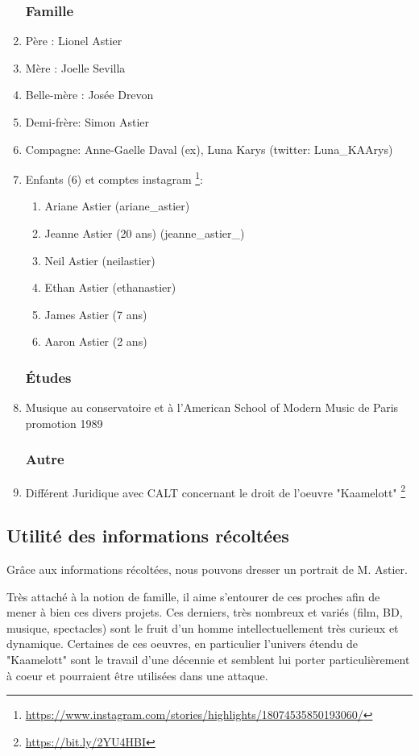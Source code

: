 \begin{enumerate}
\subsubsection{Famille}
\item Père : Lionel Astier
\item Mère : Joelle Sevilla
\item Belle-mère :  Josée Drevon
\item Demi-frère: Simon Astier
\item Compagne:  Anne-Gaelle Daval (ex), Luna Karys (twitter: Luna\_KAArys)
\item Enfants (6) et comptes instagram \footnote{\url{https://www.instagram.com/stories/highlights/18074535850193060/}}:
\begin{enumerate}
\item Ariane Astier (ariane\_astier)
\item Jeanne Astier (20 ans) (jeanne\_astier\_)
\item Neil Astier (neilastier)
\item Ethan Astier (ethanastier)
\item James Astier (7 ans)
\item Aaron Astier (2 ans)
\end{enumerate}


\subsubsection{Études}
\item Musique au conservatoire et à l’American School of Modern Music de Paris promotion 1989
\subsubsection{Autre}
\item Différent Juridique avec CALT concernant le droit de l'oeuvre "Kaamelott" \footnote{\url{https://bit.ly/2YU4HBI}}

\end{enumerate}

\subsection{Utilité des informations récoltées}
Grâce aux informations récoltées, nous pouvons dresser un portrait de M. Astier. 

Très attaché à la notion de famille, il aime s'entourer de ces proches afin de mener à bien ces divers projets.
Ces derniers, très nombreux et variés (film, BD, musique, spectacles) sont le fruit d'un homme intellectuellement très curieux et dynamique. 
Certaines de ces oeuvres, en particulier l'univers étendu de "Kaamelott" sont le travail d'une décennie et semblent lui porter particulièrement à coeur et pourraient être utilisées dans une attaque.

